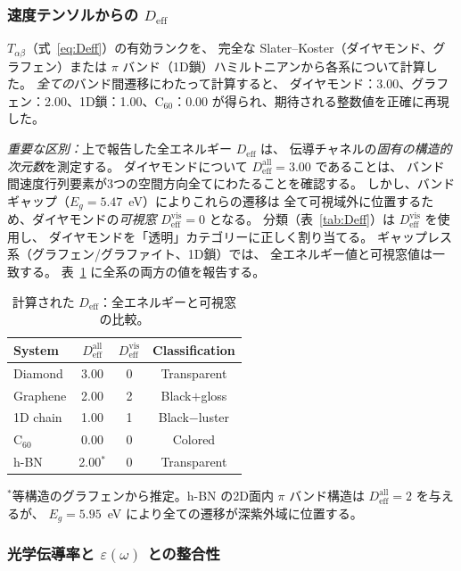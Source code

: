 \documentclass[twocolumn,showpacs,preprintnumbers,amsmath,amssymb,prb]{revtex4-2}
\begin{document}
\subsubsection{速度テンソルからの $D_\mathrm{eff}$}

$T_{\alpha\beta}$（式~\ref{eq:Deff}）の有効ランクを、
完全な Slater--Koster（ダイヤモンド、グラフェン）または
$\pi$ バンド（1D鎖）ハミルトニアンから各系について計算した。
\emph{全ての}バンド間遷移にわたって計算すると、
ダイヤモンド：3.00、グラフェン：2.00、1D鎖：1.00、C$_{60}$：0.00
が得られ、期待される整数値を正確に再現した。

\emph{重要な区別：}上で報告した全エネルギー $D_\mathrm{eff}$ は、
伝導チャネルの\emph{固有の構造的次元数}を測定する。
ダイヤモンドについて $D_\mathrm{eff}^\mathrm{all} = 3.00$ であることは、
バンド間速度行列要素が3つの空間方向全てにわたることを確認する。
しかし、バンドギャップ（$E_g = 5.47$~eV）によりこれらの遷移は
全て可視域外に位置するため、ダイヤモンドの\emph{可視窓}
$D_\mathrm{eff}^\mathrm{vis} = 0$ となる。
分類（表~\ref{tab:Deff}）は $D_\mathrm{eff}^\mathrm{vis}$ を使用し、
ダイヤモンドを「透明」カテゴリーに正しく割り当てる。
ギャップレス系（グラフェン/グラファイト、1D鎖）では、
全エネルギー値と可視窓値は一致する。
表~\ref{tab:Deff_computed} に全系の両方の値を報告する。

\begin{table}[h]
\caption{計算された $D_\mathrm{eff}$：全エネルギーと可視窓の比較。}
\label{tab:Deff_computed}
\begin{ruledtabular}
\begin{tabular}{lccc}
  System & $D_\mathrm{eff}^\mathrm{all}$ & $D_\mathrm{eff}^\mathrm{vis}$ & Classification \\
  \hline
  Diamond      & 3.00 & 0 & Transparent \\
  Graphene     & 2.00 & 2 & Black$+$gloss \\
  1D chain     & 1.00 & 1 & Black$-$luster \\
  C$_{60}$     & 0.00 & 0 & Colored \\
  h-BN         & 2.00$^*$ & 0 & Transparent \\
\end{tabular}
\end{ruledtabular}
\end{table}
\noindent $^*$等構造のグラフェンから推定。h-BN の2D面内
$\pi$ バンド構造は $D_\mathrm{eff}^\mathrm{all} = 2$ を与えるが、
$E_g = 5.95$~eV により全ての遷移が深紫外域に位置する。

\subsubsection{光学伝導率と $\varepsilon(\omega)$ との整合性}
\end{document}
